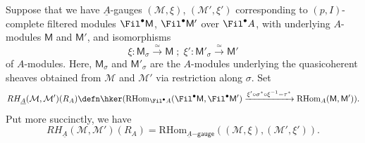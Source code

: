 \documentclass[10pt]{amsart}
\begin{document}
\begin{construction}
\label{const:A_gauges_RMap}
Suppose that we have $\underline{A}$-gauges $(\mathcal{M},\xi)$, $(\mathcal{M}',\xi')$ corresponding to $(p,I)$-complete filtered modules $\Fil^\bullet \mathsf{M}$, $\Fil^\bullet\mathsf{M}'$ over $\Fil^\bullet A$, with underlying $A$-modules $\mathsf{M}$ and $\mathsf{M}'$, and isomorphisms
\[
\xi:\mathsf{M}_\sigma\xrightarrow{\simeq}\mathsf{M}\;;\;\xi':\mathsf{M}'_\sigma\xrightarrow{\simeq}\mathsf{M}'
\]
of $A$-modules. Here, $\mathsf{M}_\sigma$ and $\mathsf{M}'_\sigma$ are the $A$-modules underlying the quasicoherent sheaves obtained from $\mathcal{M}$ and $\mathcal{M}'$ via restriction along $\sigma$. Set
\[
RH_{\underline{A}}(\mathcal{M},\mathcal{M}')({R_A})\defn \hker(\mathrm{RHom}_{\Fil^\bullet A}(\Fil^\bullet \mathsf{M},\Fil^\bullet \mathsf{M}')\xrightarrow{\xi'\circ\sigma^*\circ \xi^{-1}-\tau^*}\mathrm{RHom}_{A}(\mathsf{M},\mathsf{M}')).
\]
Put more succinctly, we have
\[
RH_{\underline{A}}(\mathcal{M},\mathcal{M}')({R_A}) = \mathrm{RHom}_{\underline{A}\mathsf{-gauge}}((\mathcal{M},\xi),(\mathcal{M}',\xi')).
\]
\end{construction}
\end{document}
